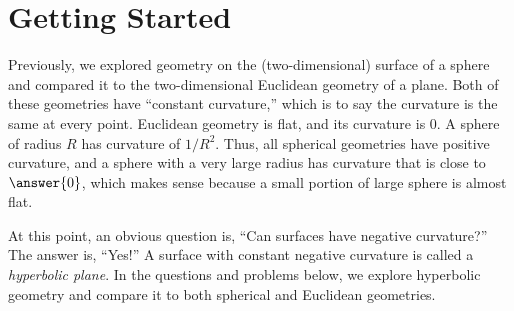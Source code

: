 \documentclass{ximera}
\begin{document}
\section*{Getting Started}
Previously, we explored geometry on the (two-dimensional) surface of a sphere and compared it to the two-dimensional Euclidean geometry of a plane.  Both of these geometries have ``constant curvature,'' which is to say the curvature is the same at every point.  Euclidean geometry is flat, and its curvature is 0.  A sphere of radius $R$ has curvature of $1/R^2$.  Thus, all spherical geometries have positive curvature, and a sphere with a very large radius has curvature that is close to $\answer{0}$, which makes sense because a small portion of large sphere is almost flat.  

At this point, an obvious question is, ``Can surfaces have negative curvature?''  The answer is, ``Yes!''  A surface with constant negative curvature is called a \emph{hyperbolic plane}.  In the questions and problems below, we explore hyperbolic geometry and compare it to both spherical and Euclidean geometries.  


\end{document}
